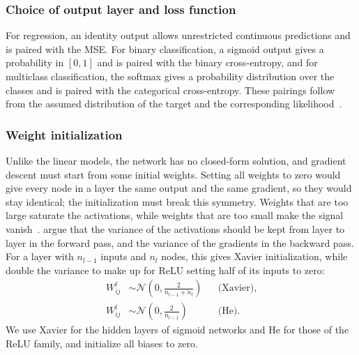 \subsubsection{Choice of output layer and loss function}\label{subsubsec:output-layer}

For regression, an identity output allows unrestricted continuous predictions and is paired
with the MSE. For binary classification, a sigmoid output gives a probability in $[0,1]$ and is
paired with the binary cross-entropy, and for multiclass classification, the softmax gives a
probability distribution over the classes and is paired with the categorical cross-entropy.
These pairings follow from the assumed distribution of the target and the corresponding
likelihood~\cite{hastie_2017,hjorth-jensen_2026}.

\subsubsection{Weight initialization}

Unlike the linear models, the network has no closed-form solution, and gradient
descent must start from some initial weights. Setting all weights to zero would
give every node in a layer the same output and the same gradient, so they would
stay identical; the initialization must break this symmetry. Weights that are too
large saturate the activations, while weights that are too small make the signal
vanish~\cite{hjorth-jensen_2026}.
\textcite{glorot_2010} argue that the variance of the activations should be kept
from layer to layer in the forward pass, and the variance of the gradients in the
backward pass. For a layer with $n_{l-1}$ inputs and $n_l$ nodes, this gives
Xavier initialization, while \textcite{he_2015} double the variance to make up for
ReLU setting half of its inputs to zero:
\begin{equation}\label{eq:initialization}
\begin{aligned}
    W^l_{ij} &\sim \mathcal{N}\!\left(0, \frac{2}{n_{l-1} + n_l}\right)
    &&\text{(Xavier)}, \\
    W^l_{ij} &\sim \mathcal{N}\!\left(0, \frac{2}{n_{l-1}}\right)
    &&\text{(He)}.
\end{aligned}
\end{equation}
We use Xavier for the hidden layers of sigmoid networks and He for those of the
ReLU family, and initialize all biases to zero.


